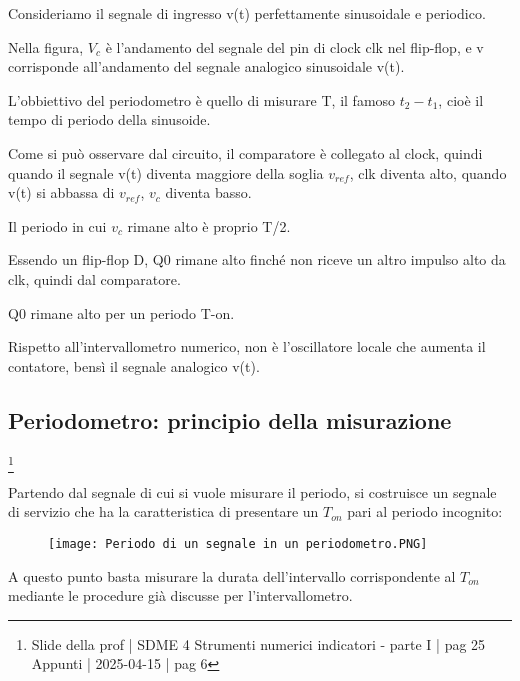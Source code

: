 Consideriamo il segnale di ingresso v(t) perfettamente sinusoidale e periodico. \newline 

Nella figura, $V_c$ è l'andamento del segnale del pin di clock clk nel flip-flop, 
e v corrisponde all'andamento del segnale analogico sinusoidale v(t). \newline 

L'obbiettivo del periodometro è quello di misurare T, il famoso $t_2 - t_1$, cioè il tempo di periodo della sinusoide. \newline 

Come si può osservare dal circuito, il comparatore è collegato al clock, 
quindi quando il segnale v(t) diventa maggiore della soglia $v_{ref}$, clk diventa alto, 
quando v(t) si abbassa di $v_{ref}$, $v_c$ diventa basso. \newline 

Il periodo in cui $v_c$ rimane alto è proprio T/2. \newline 

Essendo un flip-flop D, Q0 rimane alto finché non riceve un altro impulso alto da clk, quindi dal comparatore. \newline 

Q0 rimane alto per un periodo T-on. \newline 

Rispetto all'intervallometro numerico, non è l'oscillatore locale che aumenta il contatore, 
bensì il segnale analogico v(t). \newline 

\newpage 

\subsection{Periodometro: principio della misurazione}
\footnote{Slide della prof | SDME 4 Strumenti numerici indicatori - parte I | pag 25 \\  
Appunti | 2025-04-15 | pag 6}

Partendo dal segnale di cui si vuole misurare il periodo, 
si costruisce un segnale di servizio che ha la caratteristica di presentare un 
$T_{on}$ pari al periodo incognito: 

\begin{figure}[h]
    \centering
    \texttt{[image: Periodo di un segnale in un periodometro.PNG]}
\end{figure}

A questo punto basta misurare la durata dell'intervallo corrispondente al $T_{on}$ mediante 
le procedure già discusse per l'intervallometro. \newline 

